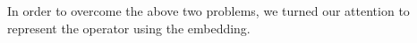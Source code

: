 In order to overcome the above two problems, we turned our attention to represent the operator using the embedding.








